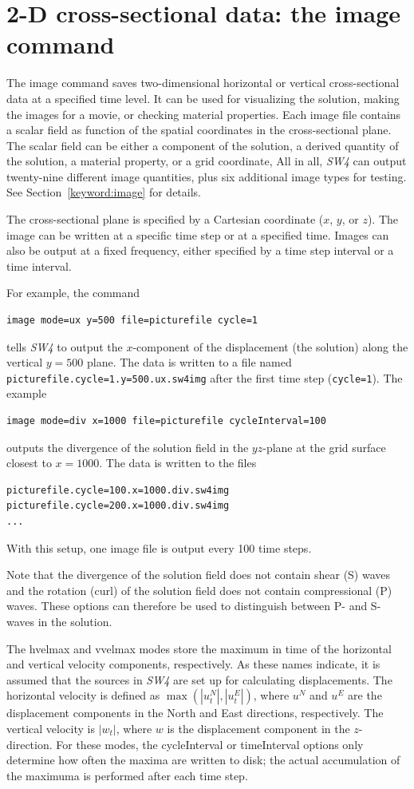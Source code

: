 \documentclass[11pt]{report}
\begin{document}
{\section{2-D cross-sectional data: the image command}
The image command saves two-dimensional horizontal or vertical cross-sectional data at a specified
time level. It can be used for visualizing the solution, making the images for a movie, or checking
material properties. Each image file contains a scalar field as function of the spatial coordinates
in the cross-sectional plane. The scalar field can be either a component of the solution, a derived
quantity of the solution, a material property, or a grid coordinate, All in all, \emph{SW4} can
output twenty-nine different image quantities, plus six additional image types for testing. See
Section~\ref{keyword:image} for details.

The cross-sectional plane is specified by a Cartesian coordinate ($x$, $y$, or $z$). The image can
be written at a specific time step or at a specified time. Images can also be output at a fixed
frequency, either specified by a time step interval or a time interval.

For example, the command
\begin{verbatim}
image mode=ux y=500 file=picturefile cycle=1
\end{verbatim}
tells \emph{SW4} to output the $x$-component of the displacement (the solution) along the vertical
$y=500$ plane.  The data is written to a file named {\tt picturefile.cycle=1.y=500.ux.sw4img} after
the first time step ({\tt cycle=1}). The example
\begin{verbatim}
image mode=div x=1000 file=picturefile cycleInterval=100
\end{verbatim}
outputs the divergence of the solution field in the $yz$-plane at the grid surface closest to
$x=1000$. The data is written to the files
\begin{verbatim} 
picturefile.cycle=100.x=1000.div.sw4img
picturefile.cycle=200.x=1000.div.sw4img
...
\end{verbatim}
With this setup, one image file is output every 100 time steps.

Note that the divergence of the solution field does not contain shear (S) waves and the
rotation (curl) of the solution field does not contain compressional (P) waves. These
options can therefore be used to distinguish between P- and S-waves in the solution.

The hvelmax and vvelmax modes store the maximum in time of the horizontal and vertical velocity
components, respectively. As these names indicate, it is assumed that the sources in \emph{SW4} are
set up for calculating displacements. The horizontal velocity is defined as $\max(|u^N_t|,|u^E_t|)$,
where $u^N$ and $u^E$ are the displacement components in the North and East directions,
respectively. The vertical velocity is $|w_t|$, where $w$ is the displacement component in the
$z$-direction. For these modes, the cycleInterval or timeInterval options only determine how often
the maxima are written to disk; the actual accumulation of the maximuma is performed after each time
step.

}
\end{document}
